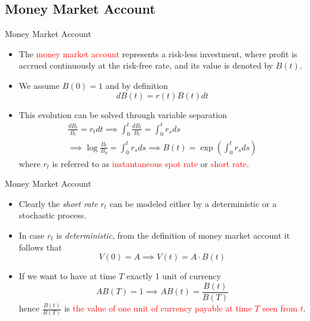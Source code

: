 \documentclass{beamer}
\begin{document}
\subsection{Money Market Account}
\begin{frame}{Money Market Account}
	\begin{itemize}
		\item<0-> The \textcolor{red}{money market account} represents a risk-less investment, where profit is accrued continuously at the risk-free rate, and its value is denoted by $B(t)$.
		\item<1-> We assume $B(0)=1$ and by definition
		\begin{equation}
			dB(t) = r(t)B(t)dt
		\end{equation}
		\item<2-> This evolution can be solved through variable separation
        \begin{equation}
            \begin{gathered}
            \frac{dB_t}{B_t} = r_t dt \implies \int_0^t \frac{dB_t}{B_t} = \int_0^t r_s ds \\
			\implies \log\frac{B_t}{B_0} = \int_0^t r_s ds \implies \boxed{B(t) = \exp\left(\int_0^t r_s ds\right)}
            \end{gathered}
		\end{equation}
		where $r_t$ is referred to as \textcolor{red}{instantaneous spot rate} or \textcolor{red}{short rate}.
	\end{itemize}
\end{frame}

\begin{frame}{Money Market Account}
	\begin{itemize}
		\item<0-> Clearly the \emph{short rate} $r_t$ can be modeled either by a deterministic or a stochastic process.
		\item<1-> In case $r_t$ is \emph{deterministic}, from the definition of money market account it follows that 
		\begin{equation*}
			V(0) = A \implies V(t) = A\cdot B(t)
		\end{equation*}
		\item<2-> If we want to have at time $T$ exactly 1 unit of currency
		\begin{equation*}
			AB(T) = 1 \implies AB(t) = \frac{B(t)}{B(T)} 
		\end{equation*}
		hence $\frac{B(t)}{B(T)}$ is \textcolor{red}{the value of one unit of currency payable at time $T$ seen from $t$}.
		
	\end{itemize}
\end{frame}
\end{document}
